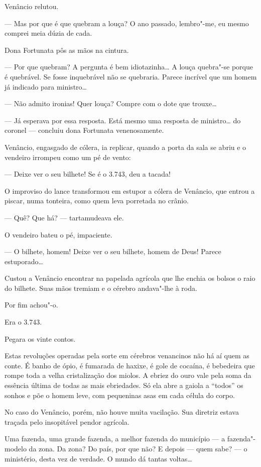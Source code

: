 Venâncio relutou.

--- Mas por que é que quebram a louça? O ano passado, lembro"-me, eu
mesmo comprei meia dúzia de cada.

Dona Fortunata pôs as mãos na cintura.

--- Por que quebram? A pergunta é bem idiotazinha\ldots{} A louça quebra"-se
porque é quebrável. Se fosse inquebrável não se quebraria. Parece
incrível que um homem já indicado para ministro\ldots{}

--- Não admito ironias! Quer louça? Compre com o dote que trouxe\ldots{}

--- Já esperava por essa resposta. Está mesmo uma resposta de
ministro\ldots{} do coronel --- concluiu dona Fortunata venenosamente.

Venâncio, engasgado de cólera, ia replicar, quando a porta da sala se
abriu e o vendeiro irrompeu como um pé de vento:

--- Deixe ver o seu bilhete! Se é o 3.743, deu a tacada!

O improviso do lance transformou em estupor a cólera de Venâncio, que
entrou a piscar, numa tonteira, como quem leva porretada no crânio.

--- Quê? Que há? --- tartamudeava ele.

O vendeiro bateu o pé, impaciente.

--- O bilhete, homem! Deixe ver o seu bilhete, homem de Deus! Parece
estuporado\ldots{}

Custou a Venâncio encontrar na papelada agrícola que lhe enchia os
bolsos o raio do bilhete. Suas mãos tremiam e o cérebro andava"-lhe à
roda.

Por fim achou"-o.

Era o 3.743.

Pegara os vinte contos.

Estas revoluções operadas pela sorte em cérebros venancinos não há aí
quem as conte. É banho de ópio, é fumarada de haxixe, é gole de cocaína,
é bebedeira que rompe toda a velha cristalização dos miolos. A ebriez do
ouro vale pela soma da essência última de todas as mais ebriedades. Só
ela abre a gaiola a ``todos'' os sonhos e põe o homem leve, com
pequeninas asas em cada célula do corpo.

No caso do Venâncio, porém, não houve muita vacilação. Sua diretriz
estava traçada pelo insopitável pendor agrícola.

Uma fazenda, uma grande fazenda, a melhor fazenda do município --- a
fazenda"-modelo da zona. Da zona? Do país, por que não? E depois --- quem
sabe? --- o ministério, desta vez de verdade. O mundo dá tantas
voltas\ldots{}

